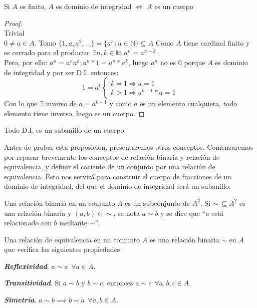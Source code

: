 \begin{nprop}
	Si $A$ es finito, $A$ es dominio de integridad $\iff$ $A$ es un cuerpo
\end{nprop}
\begin{proof}\hfill\\
	\boxed{\Leftarrow} Trivial\\
	\boxed{\Rightarrow} $0 \neq a \in A$.
Tomo $\{1,a,a^2,\dots\} = \{a^n: n\in \mathbb{N}\} \subseteq A$
Como $A$ tiene cardinal finito y es cerrado para el producto: $\exists n,k \in \mathbb{N} : a^n = a^{n+k}$.\\
Pero, por ello: $a^n = a^n a^k; a^n * 1 = a^n * a^k$, luego $a^n$ no es 0 porque $A$ es dominio de integridad y por ser D.I. entonces:
\[
1=a^k \begin{cases}
	k = 1 \Rightarrow a = 1\\
	k > 1 \Rightarrow a^{k-1}*a = 1

\end{cases}\]
Con lo que $\exists$ inverso de $a = a^{k-1}$ y como $a$ es un elemento cualquiera, todo elemento tiene inverso, luego es un cuerpo.
\end{proof}


\begin{nprop}
	Todo D.I. es un subanillo de un cuerpo.
\end{nprop}


Antes de probar esta proposición, presentaremos otros conceptos. Comenzaremos por repasar brevemente los conceptos de relación binaria y
relación de equivalencia, y definir el cociente de un conjunto por una relación de equivalencia. Esto nos servirá
para construir el cuerpo de fracciones de un dominio de integridad, del que el dominio de integridad será un subanillo.

\begin{ndef}
  Una relación binaria en un conjunto $A$ es un subconjunto de $A^2$.
  Si $\sim \ \subseteq A^2$ es una relación binaria y $(a,b) \in \sim$, se nota $a \sim b$
  y se dice que ``$a$ está relacionado con $b$ mediante $\sim$''.
\end{ndef}

\begin{ndef}
  Una relación de equivalencia en un conjunto $A$ es una relación binaria $\sim$ en $A$ que verifica las siguientes propiedades:

  \begin{nlist}
  \item \textbf{\emph{Reflexividad}}. $a \sim a \ \ \forall a \in A$.
  \item \textbf{\emph{Transitividad}}. Si $a \sim b$ y $b \sim c$, entonces $a \sim c \ \ \forall a,b,c \in A$.
    \item \textbf{\emph{Simetría}}. $a \sim b \implies b \sim a \ \ \forall a,b \in A$.
  \end{nlist}
\end{ndef}

